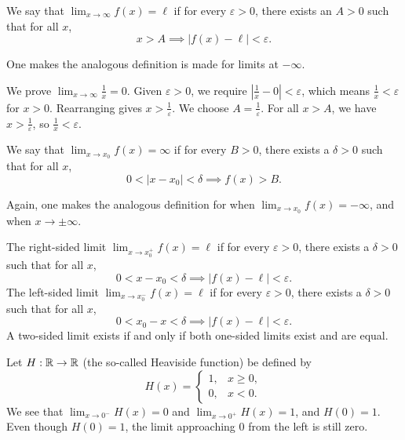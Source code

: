 \documentclass[../calculus.tex]{subfiles}
\begin{document}
\begin{definition}
    \begin{shaded*}
    We say that $\lim_{x\to\infty}f(x)=\ell$ if for every $\varepsilon>0$, there exists an $A>0$ such that for all $x$,
    \[x>A \implies |f(x)-\ell|<\varepsilon.\]
    \end{shaded*}
\end{definition}
One makes the analogous definition is made for limits at $-\infty$.

\begin{example}
    We prove $\lim_{x\to\infty}\frac{1}{x}=0$. Given $\varepsilon>0$, we require $\left|\frac{1}{x}-0\right|<\varepsilon$, which means $\frac{1}{x}<\varepsilon$ for $x>0$. Rearranging gives $x>\frac{1}{\varepsilon}$. We choose $A=\frac{1}{\varepsilon}$. For all $x>A$, we have $x>\frac{1}{\varepsilon}$, so $\frac{1}{x}<\varepsilon$.
\end{example}

\begin{definition}
    \begin{shaded*}
    We say that $\lim_{x\to x_0}f(x)=\infty$ if for every $B>0$, there exists a $\delta>0$ such that for all $x$,
    \[0<|x-x_0|<\delta \implies f(x)>B.\]
    \end{shaded*}
\end{definition}
Again, one makes the analogous definition for when $\lim_{x\to x_0}f(x)=-\infty$, and when $x\to \pm \infty$.


\begin{definition}
    \begin{shaded*}
    The right-sided limit $\lim_{x\to x_0^+}f(x)=\ell$ if for every $\varepsilon>0$, there exists a $\delta>0$ such that for all $x$,
    \[0<x-x_0<\delta \implies |f(x)-\ell|<\varepsilon.\]
    The left-sided limit $\lim_{x\to x_0^-}f(x)=\ell$ if for every $\varepsilon>0$, there exists a $\delta>0$ such that for all $x$,
    \[0<x_0-x<\delta \implies |f(x)-\ell|<\varepsilon.\]
    A two-sided limit exists if and only if both one-sided limits exist and are equal.
    \end{shaded*}
\end{definition}
\begin{example}
    Let $H:\mathbb{R}\to\mathbb{R}$ (the so-called Heaviside function) be defined by \[H(x)=\begin{cases}
        1, & x\ge 0,\\
        0, & x<0.
    \end{cases}\]
    We see that $\lim_{x\to 0^-}H(x)=0$ and $\lim_{x\to 0^+}H(x)=1$, and $H(0)=1$. Even though $H(0)=1$, the limit approaching 0 from the left is still zero.
\end{example}
\end{document}
